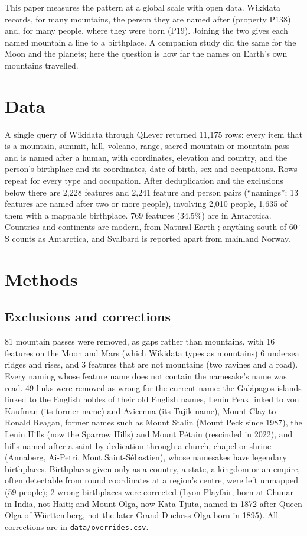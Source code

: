 \documentclass[11pt,a4paper]{article}
\begin{document}
This paper measures the pattern at a global scale with open data. Wikidata \citep{wikidata} records, for many mountains, the person they are named after (property P138) and, for many people, where they were born (P19). Joining the two gives each named mountain a line to a birthplace. A companion study did the same for the Moon and the planets; here the question is how far the names on Earth's own mountains travelled.

\section{Data}
A single query of Wikidata through QLever \citep{qlever} returned 11,175 rows: every item that is a mountain, summit, hill, volcano, range, sacred mountain or mountain pass and is named after a human, with coordinates, elevation and country, and the person's birthplace and its coordinates, date of birth, sex and occupations. Rows repeat for every type and occupation. After deduplication and the exclusions below there are 2,228 features and 2,241 feature and person pairs (``namings''; 13 features are named after two or more people), involving 2,010 people, 1,635 of them with a mappable birthplace. 769 features (34.5\%) are in Antarctica. Countries and continents are modern, from Natural Earth \citep{naturalearth}; anything south of 60$^\circ$S counts as Antarctica, and Svalbard is reported apart from mainland Norway.

\section{Methods}
\subsection{Exclusions and corrections}
81 mountain passes were removed, as gaps rather than mountains, with 16 features on the Moon and Mars (which Wikidata types as mountains) 6 undersea ridges and rises, and 3 features that are not mountains (two ravines and a road). Every naming whose feature name does not contain the namesake's name was read. 49 links were removed as wrong for the current name: the Gal\'apagos islands linked to the English nobles of their old English names, Lenin Peak linked to von Kaufman (its former name) and Avicenna (its Tajik name), Mount Clay to Ronald Reagan, former names such as Mount Stalin (Mount Peck since 1987), the Lenin Hills (now the Sparrow Hills) and Mount P\'etain (rescinded in 2022), and hills named after a saint by dedication through a church, chapel or shrine (Annaberg, Ai-Petri, Mont Saint-S\'ebastien), whose namesakes have legendary birthplaces. Birthplaces given only as a country, a state, a kingdom or an empire, often detectable from round coordinates at a region's centre, were left unmapped (59 people); 2 wrong birthplaces were corrected (Lyon Playfair, born at Chunar in India, not Haiti; and Mount Olga, now Kata Tjuta, named in 1872 after Queen Olga of W\"urttemberg, not the later Grand Duchess Olga born in 1895). All corrections are in \texttt{data/overrides.csv}.
\end{document}
